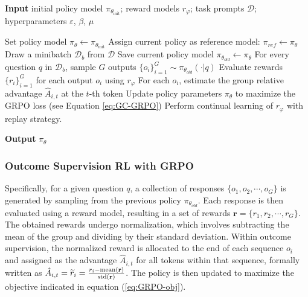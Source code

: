 \begin{itemize}[topsep=0pt]
\begin{itemize}[topsep=0pt]
\begin{algorithm}[t]
  \small
  \caption{Iterative Group Relative Policy Optimization}
  \textbf{Input} initial policy model $\pi_{\theta_{\text{init}}}$; reward models $r_\varphi$; task prompts $\mathcal{D}$; 
  hyperparameters $\varepsilon$, $\beta$, $\mu$
  \begin{algorithmic}[1]
    \State Set policy model $\pi_\theta \gets \pi_{\theta_{\text{init}}}$
       \State Assign current policy as reference model: $\pi_{ref} \gets \pi_{\theta}$
      \State Draw a minibatch $\mathcal{D}_b$ from $\mathcal{D}$
      \State Save current policy model $\pi_{\theta_{old}} \gets \pi_{\theta}$
      \State For every question $q$ in $\mathcal{D}_b$, sample $G$ outputs $\{o_i\}_{i=1}^G \sim \pi_{\theta_{old}}(\cdot | q)$
      \State Evaluate rewards $\{r_i\}_{i=1}^G$ for each output $o_i$ using $r_{\varphi}$
      \State For each $o_i$, estimate the group relative advantage $\hat{A}_{i,t}$ at the $t$-th token
        \State Update policy parameters $\pi_\theta$ to maximize the GRPO loss (see Equation \ref{eq:GC-GRPO})
      \EndFor
    \EndFor 
    \State Perform continual learning of $r_\varphi$ with replay strategy.
    \EndFor 
  \end{algorithmic}
  \textbf{Output} $\pi_\theta$
  \label{alg:iter-grpo}
\end{algorithm}

\subsubsection{Outcome Supervision RL with GRPO} Specifically, for a given question $q$, a collection of responses $\{o_1, o_2, \cdots, o_G\}$ is generated by sampling from the previous policy $\pi_{\theta_{old}}$. Each response is then evaluated using a reward model, resulting in a set of rewards $\mathbf{r} = \{r_1, r_2, \cdots, r_G\}$. The obtained rewards undergo normalization, which involves subtracting the mean of the group and dividing by their standard deviation. Within outcome supervision, the normalized reward is allocated to the end of each sequence $o_i$ and assigned as the advantage $\hat{A}_{i, t}$ for all tokens within that sequence, formally written as $\hat{A}_{i, t} = \widetilde{r}_i = \frac{r_i- {\rm mean}(\mathbf{r})}{{\rm std}(\mathbf{r})}$. The policy is then updated to maximize the objective indicated in equation (\ref{eq:GRPO-obj}).


\end{itemize}
\end{itemize}
